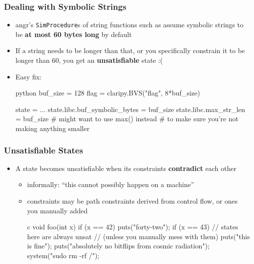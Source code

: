 \documentclass[aspectratio=169]{beamer}
\begin{document}
\begin{frame}[fragile]
    \frametitle{Dealing with Symbolic Strings}

    \label{slide:symbolic_strings}

    \begin{itemize}
        \item angr's \texttt{SimProcedure}s of string functions such as  assume symbolic strings to be \textbf{\color{brightpurple}at most 60 bytes long} by default
        \item If a string needs to be longer than that, {\footnotesize or you specifically constrain it to be longer than 60,} you get an \textbf{\color{orange}unsatisfiable} state :(
\pause
        \item Easy fix: \begin{codebox}{python}
buf_size = 128
flag = claripy.BVS("flag", 8*buf_size)

state = ...
state.libc.buf_symbolic_bytes   = buf_size
state.libc.max_str_len          = buf_size
# might want to use max() instead
# to make sure you're not making anything smaller\end{codebox}

    \end{itemize}

\end{frame}


\begin{frame}[fragile]
    \frametitle{Unsatisfiable States}

    \begin{itemize}
        \item A state becomes unsatisfiable when its constraints \textbf{\color{brightpurple}contradict} each other
        \begin{itemize}
            \item informally: ``this cannot possibly happen on a machine''
\pause
            \item constraints may be path constraints derived from control flow, or ones you manually added
            \begin{codebox}{c}
void foo(int x) {
    if (x == 42) {
        puts("forty-two");
        if (x == 43) {
            // states here are always unsat
            // (unless you manually mess with them)
            puts("this is fine");
            puts("absolutely no bitflips from cosmic radiation");
            system("sudo rm -rf /");
        }
    }
}\end{codebox}
        \end{itemize}
    \end{itemize}
\end{frame}
\end{document}
